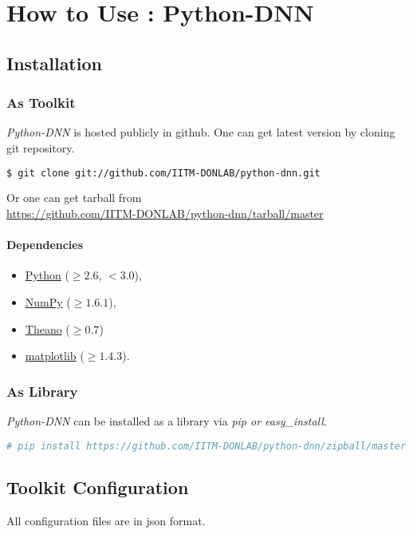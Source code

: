 \appendix
\chapter{How to Use : Python-DNN}
\label{app:pythondnn}
\section{Installation}
\subsection{As Toolkit}

\noindent \textit{Python-DNN} is hosted publicly in github. One can get latest version by cloning git repository.
\begin{lstlisting}[language=bash,basicstyle=\small] 
$ git clone git://github.com/IITM-DONLAB/python-dnn.git
\end{lstlisting}
Or one can get tarball from \\
\url{https://github.com/IITM-DONLAB/python-dnn/tarball/master}

\subsubsection{Dependencies}
\begin{itemize}
	\item \href{https://www.python.org/downloads/}{Python} ($\geq2.6$, $< 3.0$),
	\item \href{http://www.numpy.org/}{NumPy} ($\geq 1.6.1$),
	\item \href{http://www.deeplearning.net/software/theano/install.html#install}{Theano} ($\geq 0.7$)
	\item \href{http://matplotlib.org/}{matplotlib} ($\geq 1.4.3$).
\end{itemize}

\subsection{As Library}
\textit{Python-DNN} can be installed as a library via 
\textit{pip or easy\_install}.
\begin{lstlisting}[language=bash,basicstyle=\small] 
# pip install https://github.com/IITM-DONLAB/python-dnn/zipball/master
\end{lstlisting}

\section{Toolkit Configuration} 
All configuration files are in json format.

